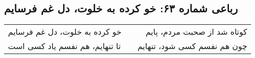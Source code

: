 \begin{center}
\section*{رباعی شماره ۶۳: خو کرده به خلوت، دل غم فرسایم}
\label{sec:063}
\begin{longtable}{l p{0.5cm} r}
خو کرده به خلوت، دل غم فرسایم
&&
کوتاه شد از صحبت مردم، پایم
\\
تا تنهایم، هم نفسم یاد کسی است
&&
چون هم نفسم کسی شود، تنهایم
\\
\end{longtable}
\end{center}
